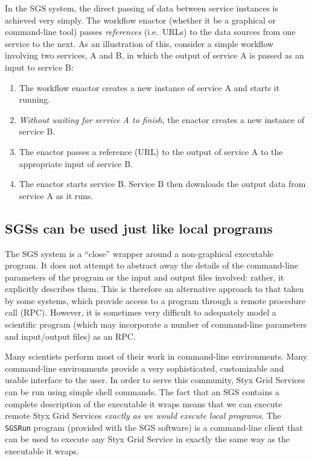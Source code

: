 \documentclass{llncs}
\begin{document}
In the SGS system, the direct passing of data between service instances is achieved very simply.  The workflow enactor (whether it be a graphical or command-line tool) passes {\em references\/} (i.e.\ URLs) to the data sources from one service to the next.  As an illustration of this, consider a simple workflow involving two services, A and B, in which the output of service A is passed as an input to service B:
\begin{enumerate}
	\item The workflow enactor creates a new instance of service A and starts it running.
	\item {\em Without waiting for service A to finish\/}, the enactor creates a new instance of service B.
	\item The enactor passes a reference (URL) to the output of service A to the appropriate input of service B.
	\item The enactor starts service B.  Service B then downloads the output data from service A as it runs.
\end{enumerate}

\subsection{SGSs can be used just like local programs}
The SGS system is a ``close'' wrapper around a non-graphical executable program.  It does not attempt to abstract away the details of the command-line parameters of the program or the input and output files involved: rather, it explicitly describes them.  This is therefore an alternative approach to that taken by some systems, which provide access to a program through a remote procedure call (RPC).  However, it is sometimes very difficult to adequately model a scientific program (which may incorporate a number of command-line parameters and input/output files) as an RPC.

Many scientists perform most of their work in command-line environments.  Many command-line environments provide a very sophisticated, customizable and usable interface to the user.  In order to serve this community, Styx Grid Services can be run using simple shell commands.  The fact that an SGS contains a complete description of the executable it wraps means that we can execute remote Styx Grid Services {\em exactly as we would execute local programs\/}.  The {\tt SGSRun} program (provided with the SGS software) is a command-line client that can be used to execute any Styx Grid Service in exactly the same way as the executable it wraps.
\end{document}
